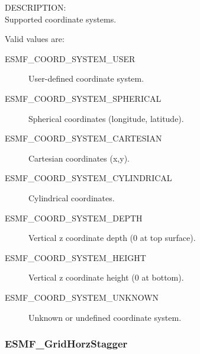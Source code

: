 {\sf DESCRIPTION:\\}
Supported coordinate systems.

Valid values are:
\begin{description}
   \item [ESMF\_COORD\_SYSTEM\_USER]
         User-defined coordinate system.

   \item [ESMF\_COORD\_SYSTEM\_SPHERICAL]
         Spherical coordinates (longitude, latitude).

   \item [ESMF\_COORD\_SYSTEM\_CARTESIAN]
         Cartesian coordinates (x,y).

   \item [ESMF\_COORD\_SYSTEM\_CYLINDRICAL] 
         Cylindrical coordinates.

   \item [ESMF\_COORD\_SYSTEM\_DEPTH]
         Vertical z coordinate depth (0 at top surface).

   \item [ESMF\_COORD\_SYSTEM\_HEIGHT]
         Vertical z coordinate height (0 at bottom).

   \item [ESMF\_COORD\_SYSTEM\_UNKNOWN]
         Unknown or undefined coordinate system.
\end{description}

\subsubsection{ESMF\_GridHorzStagger}

